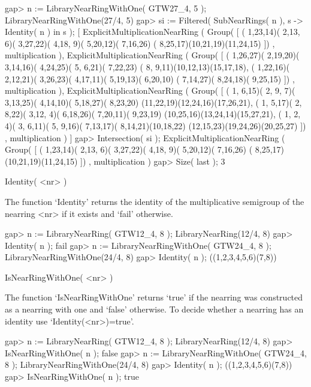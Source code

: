 \beginexample
    gap> n := LibraryNearRingWithOne( GTW27_4, 5 );              
    LibraryNearRingWithOne(27/4, 5)
    gap> si := Filtered( SubNearRings( n ), s -> Identity( n ) in s );
    [ ExplicitMultiplicationNearRing ( Group(
        [ ( 1,23,14)( 2,13, 6)( 3,27,22)( 4,18, 9)( 5,20,12)( 7,16,26)
            ( 8,25,17)(10,21,19)(11,24,15) ]) , multiplication ), 
      ExplicitMultiplicationNearRing ( Group(
        [ ( 1,26,27)( 2,19,20)( 3,14,16)( 4,24,25)( 5, 6,21)( 7,22,23)
            ( 8, 9,11)(10,12,13)(15,17,18), 
          ( 1,22,16)( 2,12,21)( 3,26,23)( 4,17,11)( 5,19,13)( 6,20,10)
            ( 7,14,27)( 8,24,18)( 9,25,15) ]) , multiplication ), 
      ExplicitMultiplicationNearRing ( Group(
        [ ( 1, 6,15)( 2, 9, 7)( 3,13,25)( 4,14,10)( 5,18,27)( 8,23,20)
            (11,22,19)(12,24,16)(17,26,21), 
          ( 1, 5,17)( 2, 8,22)( 3,12, 4)( 6,18,26)( 7,20,11)( 9,23,19)
            (10,25,16)(13,24,14)(15,27,21), 
          ( 1, 2, 4)( 3, 6,11)( 5, 9,16)( 7,13,17)( 8,14,21)(10,18,22)
            (12,15,23)(19,24,26)(20,25,27) ]) , multiplication ) ]
    gap> Intersection( si );
    ExplicitMultiplicationNearRing ( Group(
    [ ( 1,23,14)( 2,13, 6)( 3,27,22)( 4,18, 9)( 5,20,12)( 7,16,26)
        ( 8,25,17)(10,21,19)(11,24,15) ]) , multiplication )
    gap> Size( last );
    3
\endexample



\>Identity( <nr> )

The function `Identity' returns the identity of the multiplicative semigroup
of the nearring <nr> if it exists and `fail' otherwise.

\beginexample
    gap> n := LibraryNearRing( GTW12_4, 8 );            
    LibraryNearRing(12/4, 8)
    gap> Identity( n );
    fail
    gap> n := LibraryNearRingWithOne( GTW24_4, 8 ); 
    LibraryNearRingWithOne(24/4, 8)
    gap> Identity( n );
    ((1,2,3,4,5,6)(7,8))
\endexample

\>IsNearRingWithOne( <nr> )

The function `IsNearRingWithOne' returns `true' if the nearring was
constructed as a nearring with one and `false' otherwise. To decide
whether a nearring has an identity use `Identity(<nr>)=true'.

\beginexample
    gap> n := LibraryNearRing( GTW12_4, 8 );             
    LibraryNearRing(12/4, 8)
    gap> IsNearRingWithOne( n );
    false
    gap> n := LibraryNearRingWithOne( GTW24_4, 8 ); 
    LibraryNearRingWithOne(24/4, 8)
    gap> Identity( n );
    ((1,2,3,4,5,6)(7,8))
    gap> IsNearRingWithOne( n );
    true
\endexample

